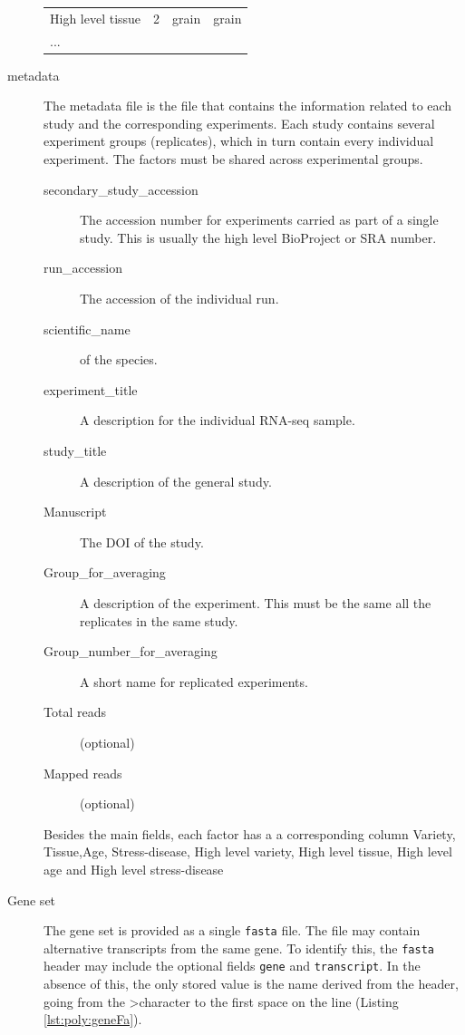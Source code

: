 \begin{description}
\begin{table}
\begin{tabular}{llll}
High level tissue & 2 & grain & grain \\
... & & \\
\bottomrule
\end{tabular}
\end{table}
\item[metadata] The metadata file is the file that contains the information related to each study and the corresponding experiments. 
Each study contains several experiment groups (replicates), which in turn contain every individual experiment. 
The factors must be shared across experimental groups. 
\begin{description}
\item[secondary\_study\_accession] The accession number for experiments carried as part of a single study. This is usually the high level BioProject or SRA number. 
\item[run\_accession] The accession of the individual run. 
\item[scientific\_name] of the species. 
\item[experiment\_title] A description for the individual RNA-seq sample.
\item[study\_title] A description of the general study.
\item[Manuscript] The DOI of the study.
\item[Group\_for\_averaging] A description of the experiment. This must be the same all the replicates in the same study. 
\item[Group\_number\_for\_averaging] A short name for replicated experiments.  
\item[Total reads] (optional)
\item[Mapped reads] (optional)
\end{description}
Besides the main fields, each factor has a a corresponding column Variety, Tissue,Age, Stress-disease, High level variety, High level tissue, High level age and High level stress-disease

\item[Gene set] The gene set is provided as a single \verb|fasta| file. 
The file may contain alternative transcripts from the same gene. To identify this, the \verb|fasta| header may include the optional fields \texttt{gene} and \texttt{transcript}. 
In the absence of this, the only stored value is the name derived from the header, going from the \textgreater character to the first space on the line (Listing \ref{lst:poly:geneFa}). 


\end{description}

